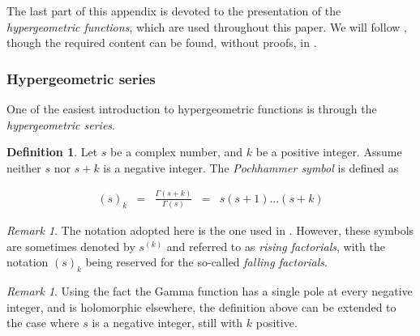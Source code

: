 \documentclass{jams-l}
\theoremstyle{definition}
\newtheorem{definition}[theorem]{Definition}
\theoremstyle{remark}
\newtheorem{remark}[theorem]{Remark}
\numberwithin{equation}{section}
\begin{document}
        The last part of this appendix is devoted to the presentation of the \textit{hypergeometric functions}, which are used throughout this paper. We will follow \cite[Sec. 5.9]{MR1429619}, though the required content can be found, without proofs, in \cite[Sec. 15]{MR2723248}.
        
        \subsubsection{Hypergeometric series}
        
            One of the easiest introduction to hypergeometric functions is through the \textit{hypergeometric series}.
        
            \begin{definition}
        
                Let $s$ be a complex number, and $k$ be a positive integer. Assume neither $s$ nor $s+k$ is a negative integer. The \textit{Pochhammer symbol} is defined as
            
                \[ \begin{array}{lllll}
                        \left( s \right)_k & = & \frac{\Gamma \left( s+k \right)}{\Gamma \left( s \right)} & = & s \left( s+1 \right) \dots \left( s+k \right)
                    \end{array} \]
        
            \end{definition}
        
            \begin{remark}
        
                The notation adopted here is the one used in \cite{MR1429619, MR2723248}. However, these symbols are sometimes denoted by $s^{\left( k \right)}$ and referred to as \textit{rising factorials}, with the notation $\left( s \right)_k$ being reserved for the so-called \textit{falling factorials}.
        
            \end{remark}
        
            \begin{remark}
        
                Using the fact the Gamma function has a single pole at every negative integer, and is holomorphic elsewhere, the definition above can be extended to the case where $s$ is a negative integer, still with $k$ positive.
        
            \end{remark}
        
\end{document}
